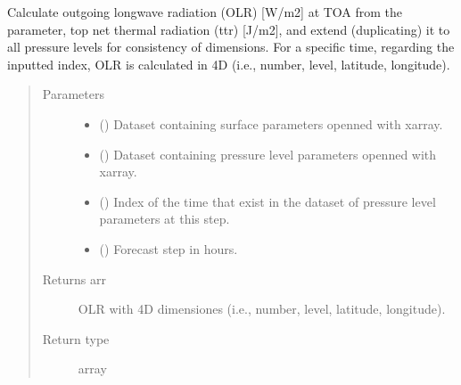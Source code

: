 \documentclass[a4paper,11pt,english]{sphinxmanual}
\begin{document}

\begin{fulllineitems}
\label{\detokenize{modules:envlib.processing_surf_vars.extend_olr_pl_5d}}
Calculate outgoing longwave radiation (OLR) {[}W/m2{]} at TOA from the parameter, top net thermal radiation (ttr)
{[}J/m2{]}, and extend (duplicating) it to all pressure levels for consistency of dimensions. For a specific time, 
regarding the inputted index, OLR is calculated in 4D (i.e., number, level, latitude, longitude).
\begin{quote}\begin{description}
\item[{Parameters}] \leavevmode\begin{itemize}
\item {} 
 () \textendash{} Dataset containing surface parameters openned with xarray.

\item {} 
 () \textendash{} Dataset containing pressure level parameters openned with xarray.

\item {} 
 () \textendash{} Index of the time that exist in the dataset of pressure level parameters at this step.

\item {} 
 () \textendash{} Forecast step in hours.

\end{itemize}

\item[{Returns arr}] \leavevmode
OLR with 4D dimensiones (i.e., number, level, latitude, longitude).

\item[{Return type}] \leavevmode
array

\end{description}\end{quote}

\end{fulllineitems}
\end{document}
